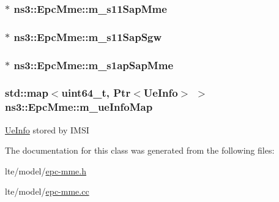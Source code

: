\subsubsection[{\texorpdfstring{m\+\_\+s11\+Sap\+Mme}{m_s11SapMme}}]{$\ast$ ns3\+::\+Epc\+Mme\+::m\+\_\+s11\+Sap\+Mme\hspace{0.3cm}{\ttfamily [private]}}\hypertarget{classns3_1_1EpcMme_a9bbf1cf43f42b68a1ebdf94ec6c5f3b1}{}\label{classns3_1_1EpcMme_a9bbf1cf43f42b68a1ebdf94ec6c5f3b1}
\subsubsection[{\texorpdfstring{m\+\_\+s11\+Sap\+Sgw}{m_s11SapSgw}}]{$\ast$ ns3\+::\+Epc\+Mme\+::m\+\_\+s11\+Sap\+Sgw\hspace{0.3cm}{\ttfamily [private]}}\hypertarget{classns3_1_1EpcMme_a2a7e19d22b289ecd9f26f5602129fa5e}{}\label{classns3_1_1EpcMme_a2a7e19d22b289ecd9f26f5602129fa5e}
\subsubsection[{\texorpdfstring{m\+\_\+s1ap\+Sap\+Mme}{m_s1apSapMme}}]{$\ast$ ns3\+::\+Epc\+Mme\+::m\+\_\+s1ap\+Sap\+Mme\hspace{0.3cm}{\ttfamily [private]}}\hypertarget{classns3_1_1EpcMme_a951fa9aae8e8467c84a477b5d8702216}{}\label{classns3_1_1EpcMme_a951fa9aae8e8467c84a477b5d8702216}
\subsubsection[{\texorpdfstring{m\+\_\+ue\+Info\+Map}{m_ueInfoMap}}]{\setlength{\rightskip}{0pt plus 5cm}std\+::map$<$uint64\+\_\+t, {\bf Ptr}$<${\bf Ue\+Info}$>$ $>$ ns3\+::\+Epc\+Mme\+::m\+\_\+ue\+Info\+Map\hspace{0.3cm}{\ttfamily [private]}}\hypertarget{classns3_1_1EpcMme_a4de6ccff4d63d5ecd08774d2517e04fc}{}\label{classns3_1_1EpcMme_a4de6ccff4d63d5ecd08774d2517e04fc}
\hyperlink{structns3_1_1EpcMme_1_1UeInfo}{Ue\+Info} stored by I\+M\+SI 

The documentation for this class was generated from the following files\+:\begin{DoxyCompactItemize}
\item 
lte/model/\hyperlink{epc-mme_8h}{epc-\/mme.\+h}\item 
lte/model/\hyperlink{epc-mme_8cc}{epc-\/mme.\+cc}\end{DoxyCompactItemize}
